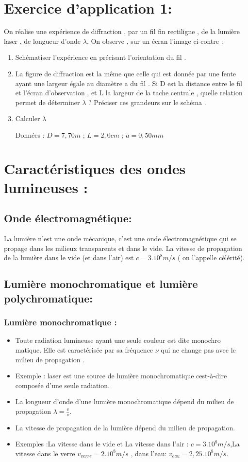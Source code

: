 \documentclass[12pt]{article}
\begin{document}
\section*{Exercice d'application 1: }
On réalise une expérience de diffraction , par un fil fin rectiligne , de la
lumière laser , de longueur d’onde $\lambda$. On observe , sur un écran l’image
ci-contre :
\begin{enumerate}
	\item Schématiser l’expérience en précisant l’orientation du fil .

	\item La figure de diffraction est la même que celle qui est donnée par une fente ayant une largeur égale au diamètre a du fil . Si D est la distance entre le fil et l’écran d’observation , et L la largeur de la tache centrale , quelle relation permet de déterminer $\lambda$ ? Préciser ces grandeurs sur le schéma .
 \item  Calculer $\lambda$

Données : $D = 7,70m$ ; $L = 2,0cm$ ; $a = 0,50mm$
\end{enumerate}

\section{Caractéristiques des ondes lumineuses : }
\subsection{Onde électromagnétique:}
La lumière n’est une onde mécanique, c’est une onde électromagnétique qui se propage dans les milieux transparents et dans le vide.
La vitesse de propagation de la lumière dans le vide (et dans l’air) est $c = 3.10^8m/s$ ( on l’appelle célérité).
\subsection{Lumière monochromatique et lumière polychromatique: }
\subsubsection{Lumière monochromatique : }
\begin{itemize}
	\item Toute radiation lumineuse ayant une seule couleur est dite monochro matique. Elle est caractérisée par sa fréquence $\nu$ qui ne change
pas avec le milieu de propagation .

\item Exemple :  laser est une source de lumière monochromatique cest-à-dire composée d'une seule radiation.
\item La longueur d'onde d'une lumière monochromatique dépend du milieu de propagation  $\lambda=\frac{v}{\nu}$.

\item La vitesse de propagation de la lumière dépend du milieu de propagation.
\item Exemples :La vitesse dans le vide et La vitesse  dans l'air : $c=3.10^8m/s$,La vitesse dans le verre $v_{verre}=2.10^8m/s$ , dans l'eau: $v_{eau}=2,25.10^8m/s$.
\end{itemize}
\end{document}
